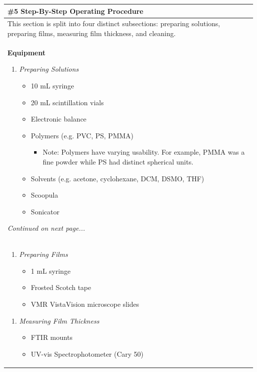 \documentclass{article}
\begin{document}
\begin{center}
\begin{longtable}{ |p{\textwidth}| }
\hline
\cellcolor{gray!25} \#5 \textbf{Step-By-Step Operating Procedure} \\
\hline
This section is split into four distinct subsections: preparing solutions, preparing films, measuring film thickness, and cleaning. \\
\textbf{Equipment}
\begin{enumerate}[series=TF]
	\item \textit{Preparing Solutions}
	\begin{itemize}
		\item 10 mL syringe
		\item 20 mL scintillation vials
		\item Electronic balance
		\item Polymers (e.g. PVC, PS, PMMA)
		\begin{itemize}
			\item Note: Polymers have varying usability. For example, PMMA was a fine powder while PS had distinct spherical units.
		\end{itemize}
		\item Solvents (e.g. acetone, cyclohexane, DCM, DSMO, THF)
		\item Scoopula 
		\item Sonicator
	\end{itemize}
\end{enumerate}
\begin{center}
	\textit{Continued on next page...}
\end{center}
\\
\begin{enumerate}[resume*=TF]
	\item \textit{Preparing Films}
	\begin{itemize}
		\item 1 mL syringe
		\item Frosted Scotch tape
		\item VMR VistaVision microscope slides
	\end{itemize}
\end{enumerate}
\begin{enumerate}[resume*=TF]
	\item \textit{Measuring Film Thickness}
	\begin{itemize}
		\item FTIR mounts
		\item UV-vis Spectrophotometer (Cary 50)
	\end{itemize}

\end{enumerate}
\end{longtable}
\end{center}
\end{document}
